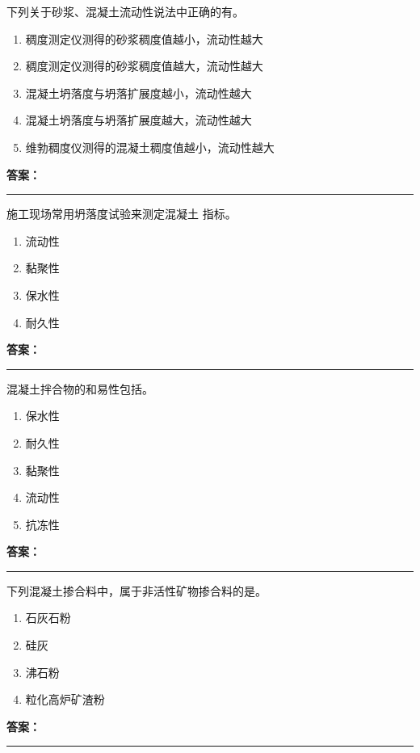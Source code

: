 \documentclass[UTF8,fontset=fandol,11pt]{ctexart}
\newcommand{\answerline}{\textcolor{answerred}{\rule{2.4cm}{0.7pt}}}
\begin{document}
\vspace{0.2em}

\begin{quizbox}[title={第 55 题}]
下列关于砂浆、混凝土流动性说法中正确的有。\\
\begin{enumerate}[label=\Alph*.]
\item 稠度测定仪测得的砂浆稠度值越小，流动性越大
\item 稠度测定仪测得的砂浆稠度值越大，流动性越大
\item 混凝土坍落度与坍落扩展度越小，流动性越大
\item 混凝土坍落度与坍落扩展度越大，流动性越大
\item 维勃稠度仪测得的混凝土稠度值越小，流动性越大
\end{enumerate}
\textbf{\textcolor{answerred}{答案：}} \answerline
\end{quizbox}

\vspace{0.2em}

\begin{quizbox}[title={第 56 题}]
施工现场常用坍落度试验来测定混凝土 指标。\\
\begin{enumerate}[label=\Alph*.]
\item 流动性
\item 黏聚性
\item 保水性
\item 耐久性
\end{enumerate}
\textbf{\textcolor{answerred}{答案：}} \answerline
\end{quizbox}

\vspace{0.2em}

\begin{quizbox}[title={第 57 题}]
混凝土拌合物的和易性包括。\\
\begin{enumerate}[label=\Alph*.]
\item 保水性
\item 耐久性
\item 黏聚性
\item 流动性
\item 抗冻性
\end{enumerate}
\textbf{\textcolor{answerred}{答案：}} \answerline
\end{quizbox}

\vspace{0.2em}

\begin{quizbox}[title={第 58 题}]
下列混凝土掺合料中，属于非活性矿物掺合料的是。\\
\begin{enumerate}[label=\Alph*.]
\item 石灰石粉
\item 硅灰
\item 沸石粉
\item 粒化高炉矿渣粉
\end{enumerate}
\textbf{\textcolor{answerred}{答案：}} \answerline
\end{quizbox}
\end{document}
